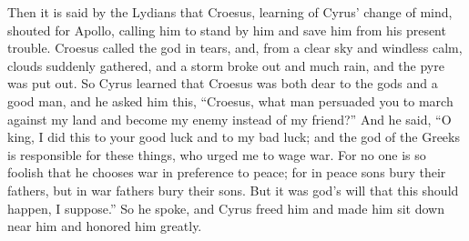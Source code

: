 \documentclass{article}
\begin{document}
Then it is said by the Lydians that Croesus, learning of Cyrus' change of mind, shouted for Apollo,
calling him to stand by him and save him from his present trouble.
Croesus called the god in tears, and, from a clear sky and windless calm,
clouds suddenly gathered, and a storm broke out and much rain, and the pyre was put out.
So Cyrus learned that Croesus was both dear to the gods and a good man,
and he asked him this, ``Croesus, what man persuaded you to march against my land and become my enemy instead of my friend?''
And he said, ``O king, Ι did this to your good luck and to my bad luck;
and the god of the Greeks is responsible for these things, who urged me to wage war.
For no one is so foolish that he chooses war in preference to peace;
for in peace sons bury their fathers, but in war fathers bury their sons.
But it was god's will  that this should happen, Ι suppose.''
So he spoke, and Cyrus freed him and made him sit down near him and honored him greatly.
\end{document}
